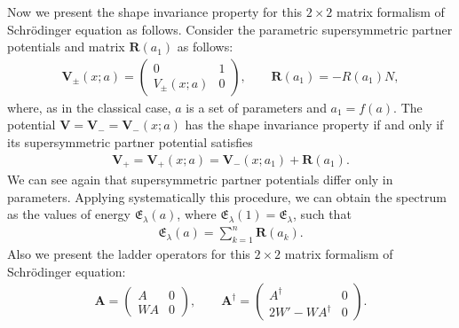 \documentclass[pdftex]{sigma}%
\numberwithin{equation}{section}
\begin{document}
Now we present the shape invariance property for this $2\times 2$ matrix formalism of Schr\"odinger equation as follows. Consider the parametric supersymmetric partner potentials and matrix $\mathbf{R}(a_1)$ as follows:
\begin{gather*}
\mathbf{V}_\pm(x;a)=\begin{pmatrix}0&1\\V_{\pm}(x;a)&0\end{pmatrix}\!,\qquad
\mathbf{R}(a_1)=-R(a_1)N,
\end{gather*}where, as in the classical case, $a$ is a set of parameters and $a_1=f(a)$. The potential $\mathbf{V}=\mathbf{V}_-=\mathbf{V}_-(x;a)$ has the shape invariance property if and only if its supersymmetric partner potential satisfies
\begin{gather*}
\mathbf{V}_+=\mathbf{V}_+(x;a)=\mathbf{V}_-(x;a_1)+\mathbf{R}(a_1).
\end{gather*}
We can see again that supersymmetric partner potentials differ only in parameters. Applying systematically this procedure, we can obtain the spectrum as the values of energy $\mathfrak E_\lambda (a)$, where $ \mathfrak E_\lambda (1) = \mathfrak E_\lambda $, such that
\begin{gather*}
\mathfrak E_\lambda (a)=\sum_{k=1}^n \mathbf{R}(a_k).
\end{gather*}
Also we present the ladder operators for this $2\times 2$ matrix formalism of Schr\"odinger equation:
\begin{gather*}
\mathbf{A}=\begin{pmatrix}A&0\\WA&0\end{pmatrix}\!,\qquad
\mathbf{A}^\dag=\begin{pmatrix} A^\dag &0\\2W'-WA^\dag &0 \end{pmatrix}\!.
\end{gather*}
\end{document}
